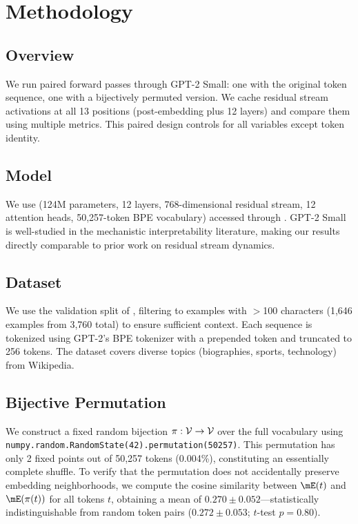 \section{Methodology}
\label{sec:methodology}

\subsection{Overview}

We run paired forward passes through GPT-2 Small: one with the original token sequence, one with a bijectively permuted version. We cache residual stream activations at all 13 positions (post-embedding plus 12 layers) and compare them using multiple metrics. This paired design controls for all variables except token identity.

\subsection{Model}

We use \gptsmall (124M parameters, 12 layers, 768-dimensional residual stream, 12 attention heads, 50,257-token BPE vocabulary) accessed through \translens \citep{elhage2021mathematical}. GPT-2 Small is well-studied in the mechanistic interpretability literature, making our results directly comparable to prior work on residual stream dynamics.

\subsection{Dataset}

We use the validation split of \wikitext \citep{merity2016pointer}, filtering to examples with $>$100 characters (1,646 examples from 3,760 total) to ensure sufficient context. Each sequence is tokenized using GPT-2's BPE tokenizer with a prepended \bos token and truncated to 256 tokens. The dataset covers diverse topics (biographies, sports, technology) from Wikipedia.

\subsection{Bijective Permutation}

We construct a fixed random bijection $\pi: \mathcal{V} \to \mathcal{V}$ over the full vocabulary using \texttt{numpy.random.RandomState(42).permutation(50257)}. This permutation has only 2 fixed points out of 50,257 tokens (0.004\%), constituting an essentially complete shuffle. To verify that the permutation does not accidentally preserve embedding neighborhoods, we compute the cosine similarity between $\embmat(t)$ and $\embmat(\perm(t))$ for all tokens $t$, obtaining a mean of $0.270 \pm 0.052$---statistically indistinguishable from random token pairs ($0.272 \pm 0.053$; $t$-test $p = 0.80$).

